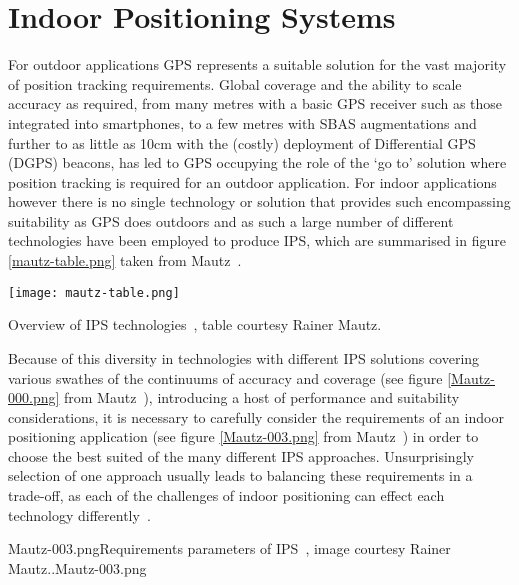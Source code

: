 

\section{Indoor Positioning Systems}

For outdoor applications GPS represents a suitable solution for the vast majority of position tracking requirements. Global coverage and the ability to scale accuracy as required, from many metres with a basic GPS receiver such as those integrated into smartphones, to a few metres with SBAS augmentations and further to as little as 10cm with the (costly) deployment of Differential GPS (DGPS) beacons, has led to GPS occupying the role of the `go to' solution where position tracking is required for an outdoor application. For indoor applications however there is no single technology or solution that provides such encompassing suitability as GPS does outdoors and as such a large number of different technologies have been employed to produce IPS, which are summarised in figure \ref{mautz-table.png} taken from Mautz~\cite{Mautz2012}.

\begin{table}
	\begin{center}
		\texttt{[image: mautz-table.png]}
	\end{center}
	\caption{Overview of IPS technologies~\cite{Mautz2012}, table courtesy Rainer Mautz.}
	\label{mautz-table.png}
\end{table}

Because of this diversity in technologies with different IPS solutions covering various swathes of the continuums of accuracy and coverage (see figure \ref{Mautz-000.png} from Mautz~\cite{Mautz2012}), introducing a host of performance and suitability considerations, it is necessary to carefully consider the requirements of an indoor positioning application (see figure \ref{Mautz-003.png} from Mautz~\cite{Mautz2012}) in order to choose the best suited of the many different IPS approaches. Unsurprisingly selection of one approach usually leads to balancing these requirements in a trade-off, as each of the challenges of indoor positioning can effect each technology differently~\cite{Mautz2009}.

       {Mautz-003.png}{Requirements parameters of IPS~\cite{Mautz2012}, image courtesy Rainer Mautz..}{Mautz-003.png}

